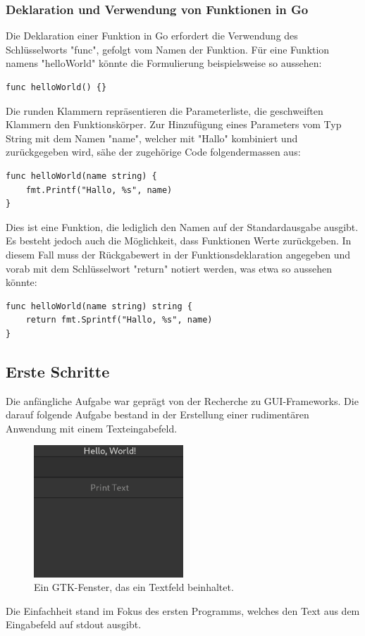 \subsubsection{Deklaration und Verwendung von Funktionen in Go}
Die Deklaration einer Funktion in Go erfordert die Verwendung des Schlüsselworts "func", gefolgt vom Namen der Funktion. Für eine Funktion namens "helloWorld" könnte die Formulierung beispielsweise so aussehen:
\begin{lstlisting}
func helloWorld() {}
\end{lstlisting}
Die runden Klammern repräsentieren die Parameterliste, die geschweiften Klammern den Funktionskörper. Zur Hinzufügung eines Parameters vom Typ String mit dem Namen "name", welcher mit "Hallo" kombiniert und zurückgegeben wird, sähe der zugehörige Code folgendermassen aus:
\begin{lstlisting}
func helloWorld(name string) {
    fmt.Printf("Hallo, %s", name)
}
\end{lstlisting}
Dies ist eine Funktion, die lediglich den Namen auf der Standardausgabe ausgibt. Es besteht jedoch auch die Möglichkeit, dass Funktionen Werte zurückgeben. In diesem Fall muss der Rückgabewert in der Funktionsdeklaration angegeben und vorab mit dem Schlüsselwort "return" notiert werden, was etwa so aussehen könnte:
\begin{lstlisting}
func helloWorld(name string) string {
    return fmt.Sprintf("Hallo, %s", name)
}
\end{lstlisting}
\subsection{Erste Schritte}
Die anfängliche Aufgabe war geprägt von der Recherche zu GUI-Frameworks. Die darauf folgende Aufgabe bestand in der Erstellung einer rudimentären Anwendung mit einem Texteingabefeld.
\begin{figure}[!ht]
\centering
\includegraphics[width=0.5\textwidth]{txt/pictures/simple_window.png}
\caption{Ein GTK-Fenster, das ein Textfeld beinhaltet.}
\label{fig:example}
\end{figure}
Die Einfachheit stand im Fokus des ersten Programms, welches den Text aus dem Eingabefeld auf stdout ausgibt.
